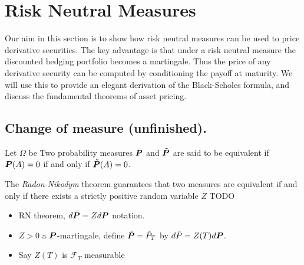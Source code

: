 
\ifstandalonechapter\setcounter{chapter}{3}\fi
\chapter{Risk Neutral Measures}

Our aim in this section is to show how risk neutral measures can be used to price derivative securities.
The key advantage is that under a risk neutral measure the discounted hedging portfolio becomes a martingale.
Thus the price of any derivative security can be computed by conditioning the payoff at maturity.
We will use this to provide an elegant derivation of the Black-Scholes formula, and discuss the fundamental theorems of asset pricing.

\section{Change of measure (unfinished).}

\begin{definition}
  Let $\Omega$ be 
  Two probability measures $\P$ and $\tilde \P$ are said to be equivalent if $\P(A) = 0$ if and only if $\tilde \P(A) = 0$.
\end{definition}

The \emph{Radon-Nikodym} theorem guarantees that two measures are equivalent if and only if there exists a strictly positive random variable $Z$ TODO

\begin{itemize}
  \item
    RN theorem, $d\tilde \P = Z d\P$ notation.

  \item
    $Z > 0$ a $\P$-martingale, define $\tilde \P = \tilde P_T$ by $d\tilde P = Z(T) d\P$.

  \item
    Say $Z(T)$ is $\mathcal F_T$ measurable
\end{itemize}



